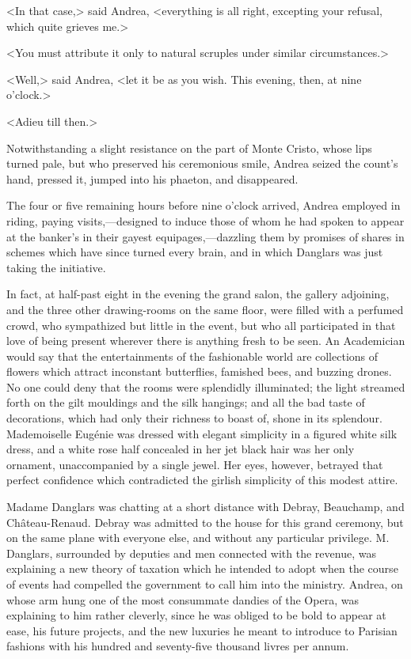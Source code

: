  <In that case,> said Andrea, <everything is all right, excepting your refusal, which quite grieves me.> 

 <You must attribute it only to natural scruples under similar circumstances.> 

 <Well,> said Andrea, <let it be as you wish. This evening, then, at nine o'clock.> 

 <Adieu till then.> 

 Notwithstanding a slight resistance on the part of Monte Cristo, whose lips turned pale, but who preserved his ceremonious smile, Andrea seized the count's hand, pressed it, jumped into his phaeton, and disappeared. 

 The four or five remaining hours before nine o'clock arrived, Andrea employed in riding, paying visits,—designed to induce those of whom he had spoken to appear at the banker's in their gayest equipages,—dazzling them by promises of shares in schemes which have since turned every brain, and in which Danglars was just taking the initiative. 

 In fact, at half-past eight in the evening the grand salon, the gallery adjoining, and the three other drawing-rooms on the same floor, were filled with a perfumed crowd, who sympathized but little in the event, but who all participated in that love of being present wherever there is anything fresh to be seen. An Academician would say that the entertainments of the fashionable world are collections of flowers which attract inconstant butterflies, famished bees, and buzzing drones.  No one could deny that the rooms were splendidly illuminated; the light streamed forth on the gilt mouldings and the silk hangings; and all the bad taste of decorations, which had only their richness to boast of, shone in its splendour. Mademoiselle Eugénie was dressed with elegant simplicity in a figured white silk dress, and a white rose half concealed in her jet black hair was her only ornament, unaccompanied by a single jewel. Her eyes, however, betrayed that perfect confidence which contradicted the girlish simplicity of this modest attire. 

 Madame Danglars was chatting at a short distance with Debray, Beauchamp, and Château-Renaud. Debray was admitted to the house for this grand ceremony, but on the same plane with everyone else, and without any particular privilege. M. Danglars, surrounded by deputies and men connected with the revenue, was explaining a new theory of taxation which he intended to adopt when the course of events had compelled the government to call him into the ministry. Andrea, on whose arm hung one of the most consummate dandies of the Opera, was explaining to him rather cleverly, since he was obliged to be bold to appear at ease, his future projects, and the new luxuries he meant to introduce to Parisian fashions with his hundred and seventy-five thousand livres per annum. 

